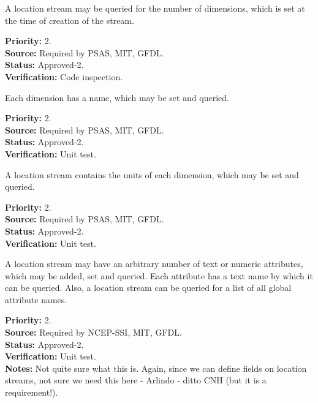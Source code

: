 A location stream may be queried for the number of dimensions, which is
set at the time of creation of the stream.
\begin{reqlist}
{\bf Priority:} 2. \\
{\bf Source:} Required by PSAS, MIT, GFDL.\\
{\bf Status:} Approved-2. \\
{\bf Verification:} Code inspection.
\end{reqlist}

Each dimension has a name, which may be set and queried.
\begin{reqlist}
{\bf Priority:} 2. \\
{\bf Source:} Required by PSAS, MIT, GFDL.\\
{\bf Status:} Approved-2. \\
{\bf Verification:} Unit test.
\end{reqlist}

A location stream contains the units of each dimension, which may be set and queried.
\begin{reqlist}
{\bf Priority:} 2. \\
{\bf Source:} Required by PSAS, MIT, GFDL.\\
{\bf Status:} Approved-2. \\
{\bf Verification:} Unit test.
\end{reqlist}


A location stream may have an arbitrary number of text or numeric attributes,
which may be added, set and queried.  Each attribute has a text name by which it
can be queried.  Also, a location stream can be queried for a list of all global
attribute names.

\begin{reqlist}
{\bf Priority:} 2. \\
{\bf Source:} Required by NCEP-SSI, MIT, GFDL. \\
{\bf Status:} Approved-2. \\
{\bf Verification:} Unit test. \\
{\bf Notes:} Not quite sure what this is. Again, since we can define fields on location streams, not sure we need this here - Arlindo - ditto CNH (but it is a requirement!).
\end{reqlist}

